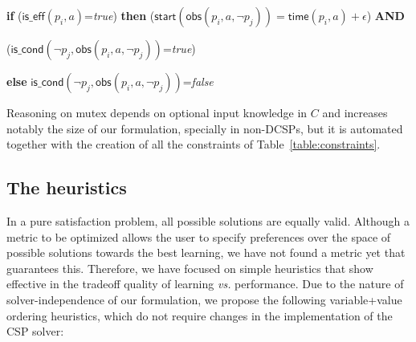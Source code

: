 \documentclass{ecai}
\newcommand{\iscond}{\mathsf{is\_cond}}    %
\newcommand{\iseff}{\mathsf{is\_eff}}    %
\newcommand{\obs}{\mathsf{obs}}    %
\newcommand{\start}{\mathsf{start}}%
\newcommand{\tim}{\mathsf{time}}   %
\begin{document}
{\scriptsize 
	\textbf{if} ($\iseff(p_i,a)$=\textit{true}) \textbf{then} ($\start(\obs(p_i,a,\neg p_j))=\tim(p_i,a)+\epsilon$) \textbf{AND}
	
	\hspace{2.85cm}($\iscond(\neg p_j,\obs(p_i,a,\neg p_j))$=\textit{true})
	
	\textbf{else} $\iscond(\neg p_j,\obs(p_i,a,\neg p_j))$=\textit{false}
}
\newline

Reasoning on mutex depends on optional input knowledge in $C$ and increases notably the size of our formulation, specially in non-DCSPs, but it is automated together with the creation of all the constraints of Table~\ref{table:constraints}.


\subsection{The heuristics}
\label{sec:implementation}

In a pure satisfaction problem, all possible solutions are equally valid. Although a metric to be optimized allows the user to specify preferences over the space of possible solutions towards the best learning, we have not found a metric yet that guarantees this.
Therefore, we have focused on simple heuristics that show effective in the tradeoff quality of learning \textit{vs.} performance. 
Due to the nature of solver-independence of our formulation, we propose the following variable+value ordering heuristics, which do not require changes in the implementation of the CSP solver:

\end{document}
